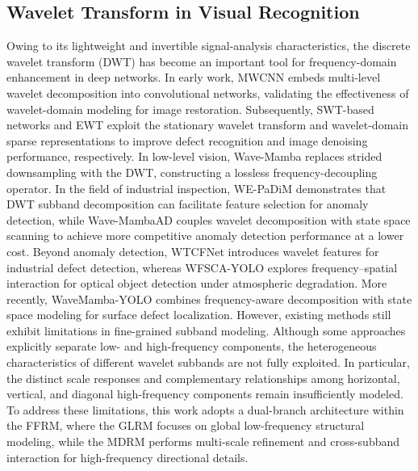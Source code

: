 \documentclass[pdflatex,sn-nature]{sn-jnl}
\begin{document}
\subsection{Wavelet Transform in Visual Recognition}
Owing to its lightweight and invertible signal-analysis characteristics, the discrete wavelet transform (DWT) has become an important tool for frequency-domain enhancement in deep networks. In early work, MWCNN \cite{Liu2018MWCNN} embeds multi-level wavelet decomposition into convolutional networks, validating the effectiveness of wavelet-domain modeling for image restoration. Subsequently, SWT-based networks \cite{Cui2025SWT} and EWT \cite{Li2024EWT} exploit the stationary wavelet transform and wavelet-domain sparse representations to improve defect recognition and image denoising performance, respectively. In low-level vision, Wave-Mamba \cite{Zou2024WaveMamba} replaces strided downsampling with the DWT, constructing a lossless frequency-decoupling operator. In the field of industrial inspection, WE-PaDiM \cite{Gardner2026WEPaDiM} demonstrates that DWT subband decomposition can facilitate feature selection for anomaly detection, while Wave-MambaAD \cite{Zhang2025WaveMambaAD} couples wavelet decomposition with state space scanning to achieve more competitive anomaly detection performance at a lower cost. Beyond anomaly detection, WTCFNet \cite{Chen2026WTCFNet} introduces wavelet features for industrial defect detection, whereas WFSCA-YOLO \cite{Yan2026WFSCAYOLO} explores frequency--spatial interaction for optical object detection under atmospheric degradation. More recently, WaveMamba-YOLO \cite{Ge2026WaveMambaYOLO} combines frequency-aware decomposition with state space modeling for surface defect localization. However, existing methods still exhibit limitations in fine-grained subband modeling. Although some approaches explicitly separate low- and high-frequency components, the heterogeneous characteristics of different wavelet subbands are not fully exploited. In particular, the distinct scale responses and complementary relationships among horizontal, vertical, and diagonal high-frequency components remain insufficiently modeled. To address these limitations, this work adopts a dual-branch architecture within the FFRM, where the GLRM focuses on global low-frequency structural modeling, while the MDRM performs multi-scale refinement and cross-subband interaction for high-frequency directional details.
\end{document}
